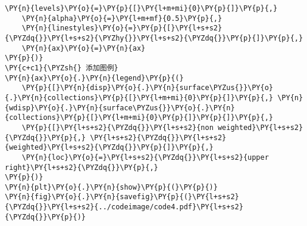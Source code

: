 \begin{Verbatim}[commandchars=\\\{\}]
    \PY{n}{levels}\PY{o}{=}\PY{p}{[}\PY{l+m+mi}{0}\PY{p}{]}\PY{p}{,}
    \PY{n}{alpha}\PY{o}{=}\PY{l+m+mf}{0.5}\PY{p}{,}
    \PY{n}{linestyles}\PY{o}{=}\PY{p}{[}\PY{l+s+s2}{\PYZdq{}}\PY{l+s+s2}{\PYZhy{}}\PY{l+s+s2}{\PYZdq{}}\PY{p}{]}\PY{p}{,}
    \PY{n}{ax}\PY{o}{=}\PY{n}{ax}
\PY{p}{)}
\PY{c+c1}{\PYZsh{} 添加图例}
\PY{n}{ax}\PY{o}{.}\PY{n}{legend}\PY{p}{(}
    \PY{p}{[}\PY{n}{disp}\PY{o}{.}\PY{n}{surface\PYZus{}}\PY{o}{.}\PY{n}{collections}\PY{p}{[}\PY{l+m+mi}{0}\PY{p}{]}\PY{p}{,} \PY{n}{wdisp}\PY{o}{.}\PY{n}{surface\PYZus{}}\PY{o}{.}\PY{n}{collections}\PY{p}{[}\PY{l+m+mi}{0}\PY{p}{]}\PY{p}{]}\PY{p}{,}
    \PY{p}{[}\PY{l+s+s2}{\PYZdq{}}\PY{l+s+s2}{non weighted}\PY{l+s+s2}{\PYZdq{}}\PY{p}{,} \PY{l+s+s2}{\PYZdq{}}\PY{l+s+s2}{weighted}\PY{l+s+s2}{\PYZdq{}}\PY{p}{]}\PY{p}{,}
    \PY{n}{loc}\PY{o}{=}\PY{l+s+s2}{\PYZdq{}}\PY{l+s+s2}{upper right}\PY{l+s+s2}{\PYZdq{}}\PY{p}{,}
\PY{p}{)}
\PY{n}{plt}\PY{o}{.}\PY{n}{show}\PY{p}{(}\PY{p}{)}
\PY{n}{fig}\PY{o}{.}\PY{n}{savefig}\PY{p}{(}\PY{l+s+s2}{\PYZdq{}}\PY{l+s+s2}{../codeimage/code4.pdf}\PY{l+s+s2}{\PYZdq{}}\PY{p}{)}
\end{Verbatim}
